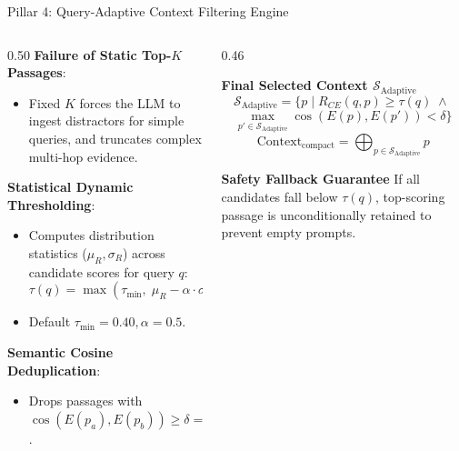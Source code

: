 \documentclass[10pt,aspectratio=169]{beamer}
\begin{document}
\begin{frame}{Pillar 4: Query-Adaptive Context Filtering Engine}
    \begin{columns}[onlytextwidth,T]
        \begin{column}{0.50\textwidth}
            \textbf{Failure of Static Top-$K$ Passages}:
            \begin{itemize}\setlength\itemsep{2pt}
                \item Fixed $K$ forces the LLM to ingest distractors for simple queries, and truncates complex multi-hop evidence.
            \end{itemize}
            
            \vspace{0.1cm}
            \textbf{Statistical Dynamic Thresholding}:
            \begin{itemize}\setlength\itemsep{2pt}
                \item Computes distribution statistics ($\mu_R, \sigma_R$) across candidate scores for query $q$:
                $$\tau(q) = \max\left(\tau_{\min}, \; \mu_R - \alpha \cdot \sigma_R\right)$$
                \item Default $\tau_{\min} = 0.40, \alpha = 0.5$.
            \end{itemize}
            
            \textbf{Semantic Cosine Deduplication}:
            \begin{itemize}\setlength\itemsep{1pt}
                \item Drops passages with $\cos(E(p_a), E(p_b)) \ge \delta = 0.85$.
            \end{itemize}
        \end{column}
        
        \begin{column}{0.46\textwidth}
            \begin{exampleblock}{\textbf{Final Selected Context $\mathcal{S}_{\text{Adaptive}}$}}
                \footnotesize
                $$\mathcal{S}_{\text{Adaptive}} = \Big\{ p \;\Big|\; R_{CE}(q, p) \ge \tau(q) \;\land\;$$
                $$\max_{p' \in \mathcal{S}_{\text{Adaptive}}} \cos(E(p), E(p')) < \delta \Big\}$$
                $$\text{Context}_{\text{compact}} = \bigoplus_{p \in \mathcal{S}_{\text{Adaptive}}} p$$
            \end{exampleblock}
            \vspace{0.1cm}
            \begin{alertblock}{\textbf{Safety Fallback Guarantee}}
                \footnotesize
                If all candidates fall below $\tau(q)$, top-scoring passage is unconditionally retained to prevent empty prompts.
            \end{alertblock}
        \end{column}
    \end{columns}
\end{frame}
\end{document}
